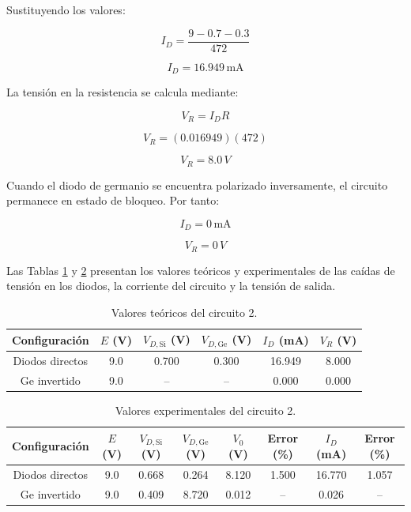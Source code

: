 Sustituyendo los valores:

\[
I_D=\frac{9-0.7-0.3}{472}
\]

\[
\boxed{I_D=16.949\,\text{mA}}
\]

La tensión en la resistencia se calcula mediante:

\[
V_R=I_D R
\]

\[
V_R=(0.016949)(472)
\]

\[
\boxed{V_R=8.0\,V}
\]

Cuando el diodo de germanio se encuentra polarizado inversamente, el circuito permanece en estado de bloqueo. Por tanto:

\[
\boxed{I_D=0\,\text{mA}}
\]

\[
\boxed{V_R=0\,V}
\]

\vspace{0.3cm}

Las Tablas \ref{tab:c2_teoricos} y \ref{tab:c2_experimentales} presentan los valores teóricos y experimentales de las caídas de tensión en los diodos, la corriente del circuito y la tensión de salida.

\begin{table}[H]
\centering
\caption{Valores teóricos del circuito 2.}
\label{tab:c2_teoricos}
\scriptsize
\begin{tabular}{c c c c c c}
\hline
\textbf{Configuración} & \(E\) (V) &
\(V_{D,\text{Si}}\) (V) &
\(V_{D,\text{Ge}}\) (V) &
\(I_D\) (mA) & \(V_R\) (V) \\
\hline
Diodos directos & 9.0 & 0.700 & 0.300 & 16.949 & 8.000 \\
Ge invertido & 9.0 & -- & -- & 0.000 & 0.000 \\
\hline
\end{tabular}
\end{table}

\begin{table}[H]
\centering
\caption{Valores experimentales del circuito 2.}
\label{tab:c2_experimentales}
\scriptsize
\begin{tabular}{c c c c c c c c}
\hline
\textbf{Configuración} & \(E\) (V) &
\(V_{D,\text{Si}}\) (V) &
\(V_{D,\text{Ge}}\) (V) &
\(V_0\) (V) & \textbf{Error (\%)} &
\(I_D\) (mA) & \textbf{Error (\%)} \\
\hline
Diodos directos & 9.0 & 0.668 & 0.264 & 8.120 & 1.500 & 16.770 & 1.057 \\
Ge invertido & 9.0 & 0.409 & 8.720 & 0.012 & -- & 0.026 & -- \\
\hline
\end{tabular}
\end{table}

